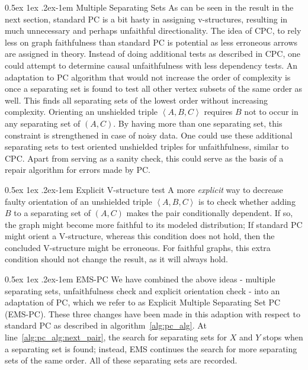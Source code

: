 \documentclass[a4paper, 10pt, english, onecolumn]{article}
\makeatletter
\renewcommand{\paragraph}{%
  \@startsection{paragraph}{4}%
  {\z@}{0.5ex \@plus 1ex \@minus .2ex}{-1em}%
  {\normalfont\normalsize\bfseries}%
}
\makeatother
\begin{document}
\paragraph{Multiple Separating Sets}
As can be seen in the result in the next section, standard PC is a bit hasty in assigning v-structures, resulting in much unnecessary and perhaps unfaithful directionality.
The idea of CPC, to rely less on graph faithfulness than standard PC is potential as less erroneous arrows are assigned in theory.
Instead of doing additional tests as described in CPC, one could attempt to determine causal unfaithfulness with less dependency tests.
An adaptation to PC algorithm that would not increase the order of complexity is once a separating set is found to test all other vertex subsets of the same order as well.
This finds all separating sets of the lowest order without increasing complexity.
Orienting an unshielded triple $\left<A,B,C\right>$ requires $B$ not to occur in any separating set of $(A,C)$.
By having more than one separating set, this constraint is strengthened in case of noisy data.
One could use these additional separating sets to test oriented unshielded triples for unfaithfulness, similar to CPC.
Apart from serving as a sanity check, this could serve as the basis of a repair algorithm for errors made by PC.

\paragraph{Explicit V-structure test}
A more \textit{explicit} way to decrease faulty orientation of an unshielded triple $\left<A,B,C\right>$ is to check whether adding $B$ to a separating set of $(A,C)$ makes the pair conditionally dependent.
If so, the graph might become more faithful to its modeled distribution; If standard PC might orient a V-structure, whereas this condition does not hold, then the concluded V-structure might be erroneous.
For faithful graphs, this extra condition should not change the result, as it will always hold.

\paragraph{EMS-PC}
We have combined the above ideas - multiple separating sets, unfaithfulness check and explicit orientation check - into an adaptation of PC, which we refer to as Explicit Multiple Separating Set PC (EMS-PC).
These three changes have been made in this adaption with respect to standard PC as described in algorithm~\ref{alg:pc_alg}.
At line~\ref{alg:pc_alg:next_pair}, the search for separating sets for $X$ and $Y$ stops when a separating set is found; instead, EMS continues the search for more separating sets of the same order.
All of these separating sets are recorded.
\end{document}
